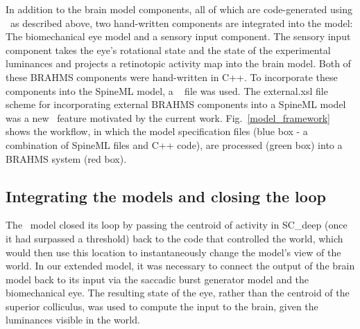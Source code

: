 \documentclass{frontiersSCNS}
\begin{document}
In addition to the brain model components, all of which are
code-generated using \stob~as described above, two hand-written
components are integrated into the model: The biomechanical eye model
and a sensory input component. The sensory input component takes the
eye's rotational state and the state of the experimental luminances
and projects a retinotopic activity map into the brain model. Both of
these BRAHMS components were hand-written in C++. To incorporate these
components into the SpineML model, a \stob~ file was
used.  The external.xsl file scheme for incorporating external BRAHMS
components into a SpineML model was a new \stob~feature motivated by
the current work.  Fig.~\ref{model_framework} shows the workflow, in
which the model specification files (blue box - a combination of
SpineML files and C++ code), are processed (green box) into a BRAHMS
system (red box).


\subsection{Integrating the models and closing the loop}
\label{sec:methods:integrating}

The \ccg~model closed its loop by passing the centroid of activity in
SC\_deep (once it had surpassed a threshold) back to the code that
controlled the world, which would then use this location to
instantaneously change the model's view of the world. In our extended
model, it was necessary to connect the output of the brain model back
to its input via the saccadic burst generator model and the
biomechanical eye. The resulting state of the eye, rather than the
centroid of the superior colliculus, was used to compute the input to
the brain, given the luminances visible in the world.

\end{document}
